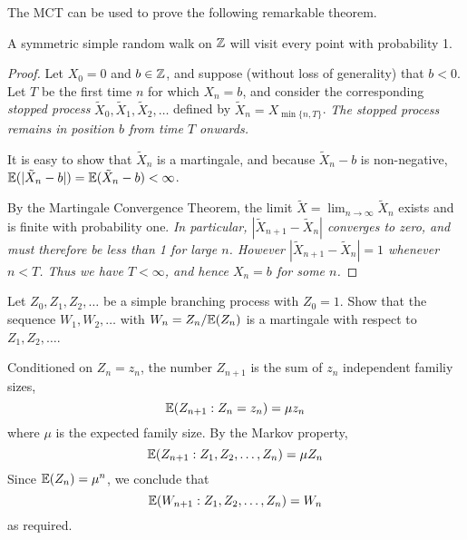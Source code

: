 The MCT can be used to prove the following remarkable theorem.
\begin{theorem}
A symmetric simple random walk on $\mathbb{Z}$ will visit every point with probability 1.
\end{theorem}
\begin{proof}
Let $X_0=0$ and $b\in\mathbb{Z}$, and suppose (without loss of generality) that $b<0$. Let $T$ be the first time $n$ for which $X_n=b$, and consider the corresponding \emph{stopped process} $\tilde{X}_0,\tilde{X}_1,\tilde{X}_2,\ldots$ defined by $\tilde{X}_n = X_{\min\{n,T\}}$.
\bit
\it The stopped process remains in position $b$ from time $T$ onwards.
\eit

It is easy to show that $\tilde{X}_n$ is a martingale, and because $\tilde{X}_n - b$ is non-negative, $\mathbb{E}(|\tilde{X}_n - b|) = \mathbb{E}(\tilde{X}_n - b) < \infty$.

\bigskip
By the Martingale Convergence Theorem, the limit $\tilde{X} = \lim_{n\to\infty}\tilde{X}_n$ exists and is finite with probability one.
\bit
\it In particular, $|\tilde{X}_{n+1} - \tilde{X}_n|$ converges to zero, and must therefore  be less than 1 for large $n$.
\it However $|\tilde{X}_{n+1} - \tilde{X}_n| = 1$ whenever $n < T$.
\it Thus we have $T<\infty$, and hence $X_n = b$ for some $n$.
\eit
\end{proof}

\begin{exercise}
Let $Z_0,Z_1,Z_2,\ldots$ be a simple branching process with $Z_0=1$. Show that the sequence $W_1,W_2,\ldots$ with $W_n=Z_n/\mathbb{E}(Z_n)$ is a martingale with respect to $Z_1,Z_2,\ldots$.
\begin{answer}
Conditioned on $Z_n=z_n$, the number $Z_{n+1}$ is the sum of $z_n$ independent familiy sizes,
\[
\mathbb{E}(Z_{n+1}: Z_n=z_n) = \mu z_n
\]
where $\mu$ is the expected family size. By the Markov property,
\[
\mathbb{E}(Z_{n+1}: Z_1,Z_2,\ldots,Z_n) = \mu Z_n
\]
Since $\mathbb{E}(Z_n)=\mu^n$, we conclude that
\[
\mathbb{E}(W_{n+1}: Z_1,Z_2,\ldots,Z_n) = W_n
\]
as required.
\end{answer}
\end{exercise}

